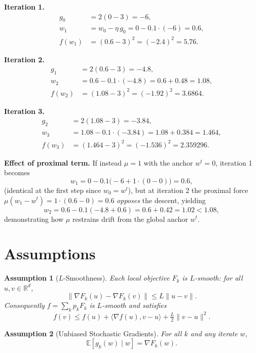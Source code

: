 \documentclass{article}
\newtheorem{assumption}{Assumption}
\begin{document}
\textbf{Iteration 1.}
\begin{align*}
g_0 &= 2(0 - 3) = -6, \\
w_1 &= w_0 - \eta\, g_0 = 0 - 0.1\cdot(-6) = 0.6, \\
f(w_1) &= (0.6 - 3)^2 = (-2.4)^2 = 5.76.
\end{align*}

\textbf{Iteration 2.}
\begin{align*}
g_1 &= 2(0.6 - 3) = -4.8, \\
w_2 &= 0.6 - 0.1\cdot(-4.8) = 0.6 + 0.48 = 1.08, \\
f(w_2) &= (1.08 - 3)^2 = (-1.92)^2 = 3.6864.
\end{align*}

\textbf{Iteration 3.}
\begin{align*}
g_2 &= 2(1.08 - 3) = -3.84, \\
w_3 &= 1.08 - 0.1\cdot(-3.84) = 1.08 + 0.384 = 1.464, \\
f(w_3) &= (1.464 - 3)^2 = (-1.536)^2 = 2.359296.
\end{align*}

\textbf{Effect of proximal term.} If instead $\mu = 1$ with the anchor $w^t = 0$, iteration 1 becomes
\[
w_1 = 0 - 0.1\big(-6 + 1\cdot(0 - 0)\big) = 0.6,
\]
(identical at the first step since $w_{0}=w^t$), but at iteration 2 the proximal force $\mu(w_1 - w^t) = 1\cdot(0.6-0)=0.6$ \emph{opposes} the descent, yielding
\[
w_2 = 0.6 - 0.1(-4.8 + 0.6) = 0.6 + 0.42 = 1.02 < 1.08,
\]
demonstrating how $\mu$ restrains drift from the global anchor $w^t$.

\section*{Assumptions}

\begin{assumption}[$L$-Smoothness]\label{as:smooth}
Each local objective $F_k$ is $L$-smooth: for all $u,v \in \mathbb{R}^d$,
\[
\|\nabla F_k(u) - \nabla F_k(v)\| \le L \|u - v\|.
\]
Consequently $f = \sum_k p_k F_k$ is $L$-smooth and satisfies
\[
f(v) \le f(u) + \langle \nabla f(u), v - u\rangle + \tfrac{L}{2}\|v-u\|^2.
\]
\end{assumption}

\begin{assumption}[Unbiased Stochastic Gradients]\label{as:unbiased}
For all $k$ and any iterate $w$,
\[
\mathbb{E}[g_k(w) \mid w] = \nabla F_k(w).
\]
\end{assumption}
\end{document}
